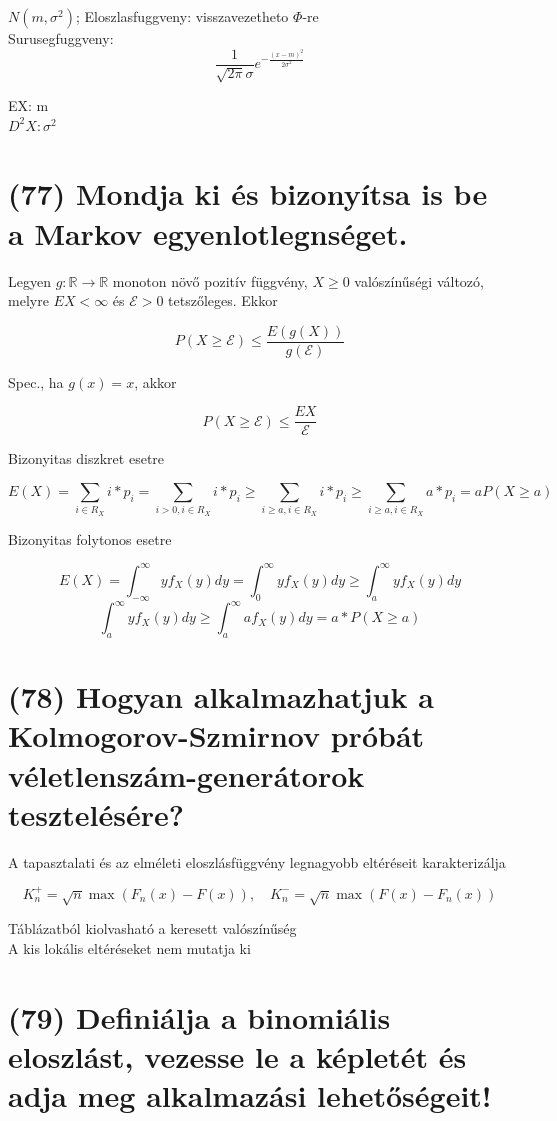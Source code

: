 \documentclass[12p]{article}
\begin{document}
$N(m, \sigma^2)$; Eloszlasfuggveny: visszavezetheto $\Phi$-re\\ Surusegfuggveny: $$\displaystyle{\frac{1}{\sqrt{2\pi} \sigma}e^{-\frac{(x-m)^2}{2\sigma^2}}}$$

EX: m\\
$D^2X: \sigma^2$

\section{(77) Mondja ki és bizonyítsa is be a Markov egyenlotlegnséget.}

Legyen $g : \mathbb{R} \rightarrow \mathbb{R}$ monoton növő pozitív függvény, $X \geq 0$ valószínűségi változó, melyre $EX < \infty$ és $\mathcal{E} > 0$ tetszőleges. Ekkor

$$P(X \geq \mathcal{E}) \leq \frac{E(g(X))}{g(\mathcal{E})}$$

Spec., ha $g(x) = x$, akkor

$$P(X \geq \mathcal{E}) \leq \frac{EX}{\mathcal{E}}$$

Bizonyitas diszkret esetre

$$E(X) = \sum_{i \in R_X} i*p_i = \sum_{i>0,i\in R_X} i*p_i \geq \sum_{i \geq a, i\in R_X} i*p_i \geq \sum_{i\geq a, i\in R_X} a*p_i = aP(X \geq a)$$

Bizonyitas folytonos esetre

$$E(X) = \int_{-\infty}^{\infty} yf_X(y)dy = \int_{0}^{\infty} yf_X(y)dy \geq \int_{a}^{\infty} yf_X(y)dy$$
$$\int_{a}^{\infty}yf_X(y)dy \geq \int_{a}^{\infty} af_X(y)dy = a * P(X \geq a)$$

\section{(78) Hogyan alkalmazhatjuk a Kolmogorov-Szmirnov próbát véletlenszám-generátorok tesztelésére?}

A tapasztalati és az elméleti eloszlásfüggvény
legnagyobb eltéréseit karakterizálja

$$K_n^{+} = \sqrt{n} \max (F_n(x) - F(x)), \quad K_n^{-}=\sqrt{n} \max(F(x) - F_n(x))$$

Táblázatból kiolvasható a keresett valószínűség\\
A kis lokális eltéréseket nem mutatja ki

\section{(79) Definiálja a binomiális eloszlást, vezesse le a képletét és adja meg alkalmazási lehetőségeit!}
\end{document}
